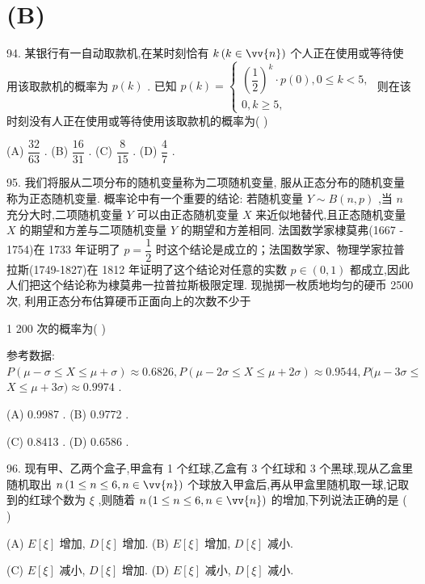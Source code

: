 \section*{(B)}

94. 某银行有一自动取款机,在某时刻恰有 $k\left( {k \in  \vv{n}}\right)$ 个人正在使用或等待使用该取款机的概率为 $p\left( k\right)$ . 已知 $p\left( k\right)  = \left\{  \begin{array}{l} {\left( \dfrac{1}{2}\right) }^{k} \cdot  p\left( 0\right) ,0 \leq  k < 5, \\  0,k \geq  5, \end{array}\right.$ 则在该时刻没有人正在使用或等待使用该取款机的概率为(   )

(A) $\dfrac{32}{63}$ . (B) $\dfrac{16}{31}$ . (C) $\dfrac{8}{15}$ . (D) $\dfrac{4}{7}$ .

95. 我们将服从二项分布的随机变量称为二项随机变量, 服从正态分布的随机变量称为正态随机变量. 概率论中有一个重要的结论: 若随机变量 $Y \sim  B\left( {n,p}\right)$ ,当 $n$ 充分大时,二项随机变量 $Y$ 可以由正态随机变量 $X$ 来近似地替代,且正态随机变量 $X$ 的期望和方差与二项随机变量 $Y$ 的期望和方差相同. 法国数学家棣莫弗(1667 - 1754)在 1733 年证明了 $p = \dfrac{1}{2}$ 时这个结论是成立的；法国数学家、物理学家拉普拉斯(1749-1827)在 1812 年证明了这个结论对任意的实数 $p \in  \left( {0,1}\right)$ 都成立,因此人们把这个结论称为棣莫弗一拉普拉斯极限定理. 现抛掷一枚质地均匀的硬币 2500 次, 利用正态分布估算硬币正面向上的次数不少于

1 200 次的概率为(   )

参考数据: $P\left( {\mu  - \sigma  \leq  X \leq  \mu  + \sigma }\right)  \approx  {0.6826},P\left( {\mu  - {2\sigma } \leq  X \leq  \mu  + {2\sigma }}\right)  \approx  {0.9544},P(\mu  - {3\sigma } \leq$  $X \leq  \mu  + {3\sigma }) \approx  {0.9974}$ .

(A) 0.9987 . (B) 0.9772 .

(C) 0.8413 . (D) 0.6586 .

96. 现有甲、乙两个盒子,甲盒有 1 个红球,乙盒有 3 个红球和 3 个黑球,现从乙盒里随机取出 $n\left( {1 \leq  n \leq  6,n \in  \vv{n}}\right)$ 个球放入甲盒后,再从甲盒里随机取一球,记取到的红球个数为 $\xi$ ,则随着 $n\left( {1 \leq  n \leq  6,n \in  \vv{n}}\right)$ 的增加,下列说法正确的是 (   )

(A) $E\left\lbrack  \xi \right\rbrack$ 增加, $D\left\lbrack  \xi \right\rbrack$ 增加. (B) $E\left\lbrack  \xi \right\rbrack$ 增加, $D\left\lbrack  \xi \right\rbrack$ 减小.

(C) $E\left\lbrack  \xi \right\rbrack$ 减小, $D\left\lbrack  \xi \right\rbrack$ 增加. (D) $E\left\lbrack  \xi \right\rbrack$ 减小, $D\left\lbrack  \xi \right\rbrack$ 减小.

